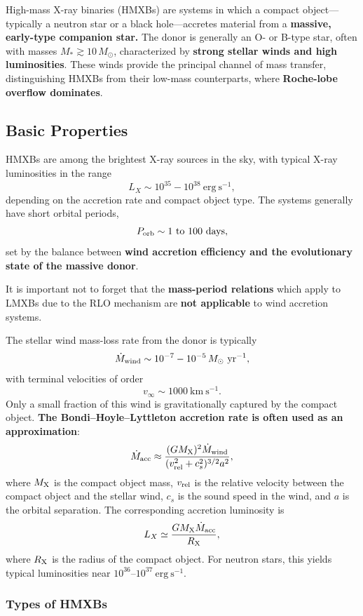 High-mass X-ray binaries (HMXBs) are systems in which a compact object---typically a neutron star or a black hole---accretes material from a \textbf{massive, early-type companion star.} The donor is generally an O- or B-type star, often with masses $M_\ast \gtrsim 10\,M_\odot$, characterized by \textbf{strong stellar winds and high luminosities}. These winds provide the principal channel of mass transfer, distinguishing HMXBs from their low-mass counterparts, where \textbf{Roche-lobe overflow dominates}.

\subsection{Basic Properties}

HMXBs are among the brightest X-ray sources in the sky, with typical X-ray luminosities in the range
\[
L_X \sim 10^{35} - 10^{38}~\mathrm{erg~s^{-1}},
\]
depending on the accretion rate and compact object type. The systems generally have short orbital periods,
\[
P_{\rm orb} \sim 1~\text{to}~100~\mathrm{days},
\]
set by the balance between \textbf{wind accretion efficiency and the evolutionary state of the massive donor}.  
\begin{remark}
    It is important not to forget that the \textbf{mass-period relations} which apply to LMXBs due to the RLO mechanism are \textbf{not applicable} to wind accretion systems.
\end{remark}

The stellar wind mass-loss rate from the donor is typically
\[
\dot{M}_{\rm wind} \sim 10^{-7} - 10^{-5}\,M_\odot~\mathrm{yr^{-1}},
\]
with terminal velocities of order
\[
v_\infty \sim 1000~\mathrm{km~s^{-1}}.
\]
Only a small fraction of this wind is gravitationally captured by the compact object.\textbf{ The Bondi–Hoyle–Lyttleton accretion rate is often used as an approximation}:
\[
\dot{M}_{\rm acc} \approx \frac{(G M_{\rm X})^2 \dot{M}_{\rm wind}}
{(v_{\rm rel}^2 + c_s^2)^{3/2} a^2},
\]
where $M_{\rm X}$ is the compact object mass, $v_{\rm rel}$ is the relative velocity between the compact object and the stellar wind, $c_s$ is the sound speed in the wind, and $a$ is the orbital separation. 
The corresponding accretion luminosity is
\[
L_X \simeq \frac{G M_{\rm X} \dot{M}_{\rm acc}}{R_{\rm X}},
\]
where $R_{\rm X}$ is the radius of the compact object. For neutron stars, this yields typical luminosities near $10^{36}$--$10^{37}~\mathrm{erg~s^{-1}}$.

\subsubsection{Types of HMXBs}

